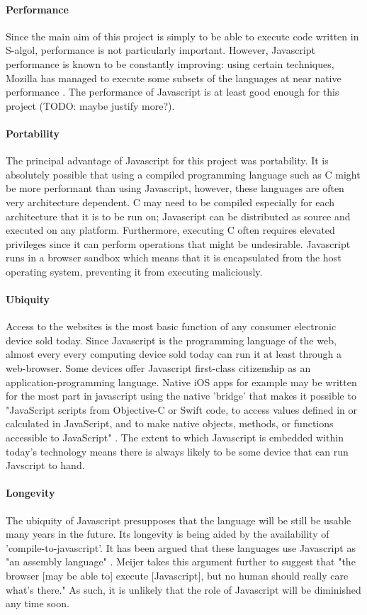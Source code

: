 \documentclass{article}
\begin{document}
\paragraph{Performance} Since the main aim of this project is simply to be able to execute code written in S-algol, performance is not particularly important. However, Javascript performance is known to be constantly improving: using certain techniques, Mozilla has managed to execute some subsets of the languages at near native performance \cite{moz}. The performance of Javascript is at least good enough for this project (TODO: maybe justify more?). 

\paragraph{Portability} The principal advantage of Javascript for this project was portability. It is absolutely possible that using a compiled programming language such as C might be more performant than using Javascript, however, these languages are often very architecture dependent. C may need to be compiled especially for each architecture that it is to be run on; Javascript can be distributed as source and executed on any platform. Furthermore, executing C often requires elevated privileges since it can perform operations that might be undesirable. Javascript runs in a browser sandbox which means that it is encapsulated from the host operating system, preventing it from executing maliciously.

\paragraph{Ubiquity} Access to the websites is the most basic function of any consumer electronic device sold today. Since Javascript is the programming language of the web, almost every every computing device sold today can run it at least through a web-browser. Some devices offer Javascript first-class citizenship as an application-programming language. Native iOS apps for example may be written for the most part in javascript using the native 'bridge' that makes it possible to "JavaScript scripts from Objective-C or Swift code, to access values defined in or calculated in JavaScript, and to make native objects, methods, or functions accessible to JavaScript" \cite{apple}. The extent to which Javascript is embedded within today's technology means there is always likely to be some device that can run Javscript to hand.

\paragraph{Longevity} The ubiquity of Javascript presupposes that the language will be still be usable many years in the future. Its longevity is being aided by the availability of 'compile-to-javascript'. It has been argued that these languages use Javascript as "an assembly language" \cite{hanselman}. Meijer takes this argument further to suggest that "the browser [may be able to] execute [Javascript], but no human should really care what’s there." As such, it is unlikely that the role of Javascript will be diminished any time soon.
\end{document}
